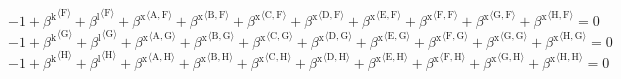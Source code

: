 \begin{equation}
-1 + {\beta^{\mathrm{k}}}^{\langle \mathrm{\mathrm{F}}\rangle} + {\beta^{\mathrm{l}}}^{\langle \mathrm{\mathrm{F}}\rangle} + {\beta^{\mathrm{x}}}^{\langle \mathrm{\mathrm{A}},\mathrm{\mathrm{F}}\rangle} + {\beta^{\mathrm{x}}}^{\langle \mathrm{\mathrm{B}},\mathrm{\mathrm{F}}\rangle} + {\beta^{\mathrm{x}}}^{\langle \mathrm{\mathrm{C}},\mathrm{\mathrm{F}}\rangle} + {\beta^{\mathrm{x}}}^{\langle \mathrm{\mathrm{D}},\mathrm{\mathrm{F}}\rangle} + {\beta^{\mathrm{x}}}^{\langle \mathrm{\mathrm{E}},\mathrm{\mathrm{F}}\rangle} + {\beta^{\mathrm{x}}}^{\langle \mathrm{\mathrm{F}},\mathrm{\mathrm{F}}\rangle} + {\beta^{\mathrm{x}}}^{\langle \mathrm{\mathrm{G}},\mathrm{\mathrm{F}}\rangle} + {\beta^{\mathrm{x}}}^{\langle \mathrm{\mathrm{H}},\mathrm{\mathrm{F}}\rangle} = 0
\end{equation}
\begin{equation}
-1 + {\beta^{\mathrm{k}}}^{\langle \mathrm{\mathrm{G}}\rangle} + {\beta^{\mathrm{l}}}^{\langle \mathrm{\mathrm{G}}\rangle} + {\beta^{\mathrm{x}}}^{\langle \mathrm{\mathrm{A}},\mathrm{\mathrm{G}}\rangle} + {\beta^{\mathrm{x}}}^{\langle \mathrm{\mathrm{B}},\mathrm{\mathrm{G}}\rangle} + {\beta^{\mathrm{x}}}^{\langle \mathrm{\mathrm{C}},\mathrm{\mathrm{G}}\rangle} + {\beta^{\mathrm{x}}}^{\langle \mathrm{\mathrm{D}},\mathrm{\mathrm{G}}\rangle} + {\beta^{\mathrm{x}}}^{\langle \mathrm{\mathrm{E}},\mathrm{\mathrm{G}}\rangle} + {\beta^{\mathrm{x}}}^{\langle \mathrm{\mathrm{F}},\mathrm{\mathrm{G}}\rangle} + {\beta^{\mathrm{x}}}^{\langle \mathrm{\mathrm{G}},\mathrm{\mathrm{G}}\rangle} + {\beta^{\mathrm{x}}}^{\langle \mathrm{\mathrm{H}},\mathrm{\mathrm{G}}\rangle} = 0
\end{equation}
\begin{equation}
-1 + {\beta^{\mathrm{k}}}^{\langle \mathrm{\mathrm{H}}\rangle} + {\beta^{\mathrm{l}}}^{\langle \mathrm{\mathrm{H}}\rangle} + {\beta^{\mathrm{x}}}^{\langle \mathrm{\mathrm{A}},\mathrm{\mathrm{H}}\rangle} + {\beta^{\mathrm{x}}}^{\langle \mathrm{\mathrm{B}},\mathrm{\mathrm{H}}\rangle} + {\beta^{\mathrm{x}}}^{\langle \mathrm{\mathrm{C}},\mathrm{\mathrm{H}}\rangle} + {\beta^{\mathrm{x}}}^{\langle \mathrm{\mathrm{D}},\mathrm{\mathrm{H}}\rangle} + {\beta^{\mathrm{x}}}^{\langle \mathrm{\mathrm{E}},\mathrm{\mathrm{H}}\rangle} + {\beta^{\mathrm{x}}}^{\langle \mathrm{\mathrm{F}},\mathrm{\mathrm{H}}\rangle} + {\beta^{\mathrm{x}}}^{\langle \mathrm{\mathrm{G}},\mathrm{\mathrm{H}}\rangle} + {\beta^{\mathrm{x}}}^{\langle \mathrm{\mathrm{H}},\mathrm{\mathrm{H}}\rangle} = 0
\end{equation}





